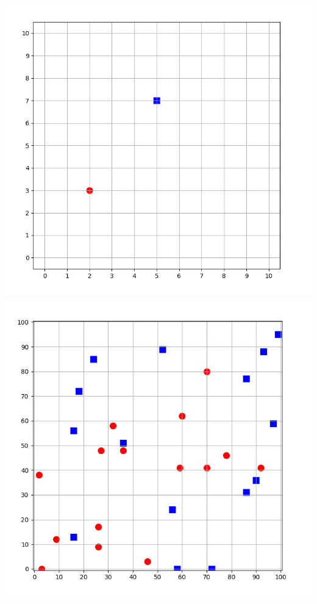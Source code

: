 \documentclass[11pt,class=report,crop=false]{standalone}
\begin{document}
\begin{activite}
\begin{enumerate}
\begin{enumerate}
		\begin{center}
			\includegraphics[scale=\myscale,scale=0.25]{ecran-voisins-1} \quad
			\includegraphics[scale=\myscale,scale=0.25]{ecran-voisins-2}
		\end{center}
		

\end{enumerate}
\end{enumerate}
\end{activite}
\end{document}
